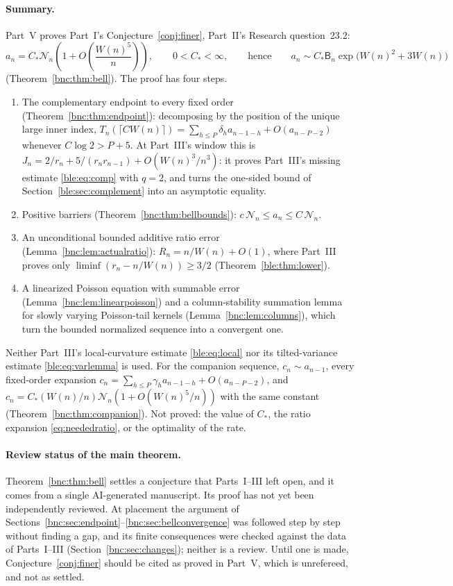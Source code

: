 \documentclass[11pt]{article}
\numberwithin{equation}{section}
\theoremstyle{definition}
\theoremstyle{remark}
\begin{document}
\paragraph{Summary.}
Part~V proves Part~I's Conjecture~\ref{conj:finer}, Part~II's Research
question~23.2:
\[
 a_n=C_*\mathcal N_n\left(1+O\!\left(\frac{W(n)^5}{n}\right)\right),
 \qquad 0<C_*<\infty,
 \qquad\text{hence}\qquad
 a_n\sim C_*\mathsf B_n\exp\bigl(W(n)^2+3W(n)\bigr)
\]
(Theorem~\ref{bnc:thm:bell}). The proof has four steps.
\begin{enumerate}[nosep]
\item The complementary endpoint to every fixed order
(Theorem~\ref{bnc:thm:endpoint}): decomposing by the position of the
unique large inner index,
$T_n(\lceil CW(n)\rceil)=\sum_{h\le P}\delta_ha_{n-1-h}+O(a_{n-P-2})$
whenever $C\log2>P+5$. At Part~III's window this is
$J_n=2/r_n+5/(r_nr_{n-1})+O(W(n)^3/n^3)$: it proves Part~III's missing
estimate \eqref{ble:eq:comp} with $q=2$, and turns the one-sided bound
of Section~\ref{ble:sec:complement} into an asymptotic equality.
\item Positive barriers (Theorem~\ref{bnc:thm:bellbounds}):
$c\,\mathcal N_n\le a_n\le C\,\mathcal N_n$.
\item An unconditional bounded additive ratio error
(Lemma~\ref{bnc:lem:actualratio}): $R_n=n/W(n)+O(1)$, where Part~III
proves only $\liminf(r_n-n/W(n))\ge3/2$
(Theorem~\ref{ble:thm:lower}).
\item A linearized Poisson equation with summable error
(Lemma~\ref{bnc:lem:linearpoisson}) and a column-stability summation
lemma for slowly varying Poisson-tail kernels
(Lemma~\ref{bnc:lem:columns}), which turn the bounded normalized
sequence into a convergent one.
\end{enumerate}
Neither Part~III's local-curvature estimate \eqref{ble:eq:local} nor its
tilted-variance estimate \eqref{ble:eq:varlemma} is used. For the
companion sequence, $c_n\sim a_{n-1}$, every fixed-order expansion
$c_n=\sum_{h\le P}\gamma_ha_{n-1-h}+O(a_{n-P-2})$, and
$c_n=C_*(W(n)/n)\mathcal N_n(1+O(W(n)^5/n))$ with the same constant
(Theorem~\ref{bnc:thm:companion}). Not proved: the value of $C_*$, the
ratio expansion \eqref{eq:neededratio}, or the optimality of the rate.

\paragraph{Review status of the main theorem.}
Theorem~\ref{bnc:thm:bell} settles a conjecture that Parts~I--III left
open, and it comes from a single AI-generated manuscript. Its proof has
not yet been independently reviewed. At placement the argument of
Sections~\ref{bnc:sec:endpoint}--\ref{bnc:sec:bellconvergence} was
followed step by step without finding a gap, and its finite consequences
were checked against the data of Parts~I--III
(Section~\ref{bnc:sec:changes}); neither is a review. Until one is made,
Conjecture~\ref{conj:finer} should be cited as proved in Part~V, which is
unrefereed, and not as settled.
\end{document}
